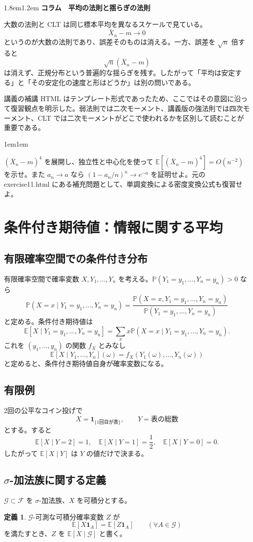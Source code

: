 \documentclass[a4paper,11pt,pdflatex,ja=standard,jafont=ipaex-type1,
  magstyle=real,scale=1]{bxjsarticle}
\theoremstyle{definition}
\newtheorem{definition}[theorem]{定義}
\theoremstyle{remark}
\newenvironment{columnnote}[1]
{\par\medskip\begin{adjustwidth}{1.8em}{1.2em}\small\sffamily\color{ColumnText}
{\large\bfseries\color{Accent}コラム　#1}\par\vspace{0.25em}{\color{Accent}\hrule height 0.7pt}\vspace{0.65em}}
{\par\vspace{0.45em}{\color{Accent}\hrule height 0.3pt}\end{adjustwidth}\medskip}
\newenvironment{exerciseblock}
{\par\medskip\begin{adjustwidth}{1em}{1em}\small\sffamily{\bfseries\color{SoftGray}演習・補足}\par\vspace{0.2em}}
{\end{adjustwidth}\medskip}
\newcommand{\E}{\mathbb E}
\newcommand{\Pp}{\mathbb P}
\newcommand{\1}{\mathbf 1}
\begin{document}
\begin{columnnote}{平均の法則と揺らぎの法則}
大数の法則と CLT は同じ標本平均を異なるスケールで見ている。
\[
\bar X_n-m\to0
\]
というのが大数の法則であり、誤差そのものは消える。一方、誤差を $\sqrt n$ 倍すると
\[
\sqrt n(\bar X_n-m)
\]
は消えず、正規分布という普遍的な揺らぎを残す。したがって「平均は安定する」と「その安定化の速度と形はどうか」は別の問いである。

講義の補講 HTML はテンプレート形式であったため、ここではその意図に沿って復習観点を明示した。弱法則では二次モーメント、講義版の強法則では四次モーメント、CLT では二次モーメントがどこで使われるかを区別して読むことが重要である。
\end{columnnote}

\begin{exerciseblock}
$(\bar X_n-m)^4$ を展開し、独立性と中心化を使って $\E[(\bar X_n-m)^4]=O(n^{-2})$ を示せ。また $a_n\to a$ なら $(1-a_n/n)^n\to e^{-a}$ を証明せよ。元の exercise11.html にある補充問題として、単調変換による密度変換公式も復習せよ。
\end{exerciseblock}

\section{条件付き期待値：情報に関する平均}
\subsection{有限確率空間での条件付き分布}
有限確率空間で確率変数 $X,Y_1,\dots,Y_n$ を考える。$\Pp(Y_1=y_1,\dots,Y_n=y_n)>0$ なら
\[
\Pp(X=x\mid Y_1=y_1,\dots,Y_n=y_n)
=\frac{\Pp(X=x,Y_1=y_1,\dots,Y_n=y_n)}
{\Pp(Y_1=y_1,\dots,Y_n=y_n)}
\]
と定める。条件付き期待値は
\[
\E[X\mid Y_1=y_1,\dots,Y_n=y_n]
=\sum_x x\Pp(X=x\mid Y_1=y_1,\dots,Y_n=y_n).
\]
これを $(y_1,\dots,y_n)$ の関数 $f_X$ とみなし
\[
\E[X\mid Y_1,\dots,Y_n](\omega)
=f_X(Y_1(\omega),\dots,Y_n(\omega))
\]
と定めると、条件付き期待値自身が確率変数になる。

\subsection{有限例}
2回の公平なコイン投げで
\[
X=\1_{\{\text{1回目が表}\}},
\qquad
Y=\text{表の総数}
\]
とする。すると
\[
\E[X\mid Y=2]=1,
\quad
\E[X\mid Y=1]=\frac12,
\quad
\E[X\mid Y=0]=0.
\]
したがって $\E[X\mid Y]$ は $Y$ の値だけで決まる。

\subsection{$\sigma$-加法族に関する定義}
$\mathcal G\subset\mathcal F$ を $\sigma$-加法族、$X$ を可積分とする。
\begin{definition}
$\mathcal G$-可測な可積分確率変数 $Z$ が
\[
\E[X\1_A]=\E[Z\1_A]
\qquad(\forall A\in\mathcal G)
\]
を満たすとき、$Z$ を $\E[X\mid\mathcal G]$ と書く。
\end{definition}
\end{document}
